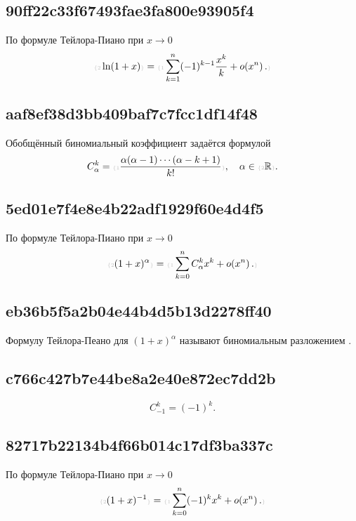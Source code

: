 \documentclass[11pt, a5paper]{article}
\newenvironment{note}[1]{\goodbreak\par\subsection{\hfill \color{lightgray}\tiny #1}}{}
\newenvironment{icloze}[2][\ldots]{%
  \ignorespaces\text{\tiny \color{lightgray}\{#2} %
}{%
  \text{\tiny\color{lightgray}\}}\unskip%
}
\begin{document}
\begin{note}{90ff22c33f67493fae3fa800e93905f4}
    По формуле Тейлора-Пиано при \( x \to 0 \)
    \[
        \begin{icloze}{2}\ln (1 + x)\end{icloze} = \begin{icloze}{1}\sum_{k=1}^{n} (-1)^{k - 1} \frac{x^{k} }{k } + o\!\left(x^{n}\right). \end{icloze}
    \]
\end{note}

\begin{note}{aaf8ef38d3bb409baf7c7fcc1df14f48}
    \begin{icloze}{3}Обобщённый биномиальный коэффициент\end{icloze} задаётся формулой
    \[
        C_\alpha^k = \begin{icloze}{1}\frac{\alpha(\alpha - 1) \cdots (\alpha - k + 1)}{k! }\end{icloze}, \quad \alpha \in \begin{icloze}{2}\mathbb R\end{icloze}.
    \]
\end{note}

\begin{note}{5ed01e7f4e8e4b22adf1929f60e4d4f5}
    По формуле Тейлора-Пиано при \( x \to 0 \)
    \[
        \begin{icloze}{2}(1 + x)^{\alpha} \end{icloze} = \begin{icloze}{1}\sum_{k=0}^{n} C_\alpha^k x^{k} + o\!\left(x^{n}\right). \end{icloze}
    \]
\end{note}

\begin{note}{eb36b5f5a2b04e44b4d5b13d2278ff40}
    Формулу Тейлора-Пеано для \( (1 + x)^{\alpha} \) называют \begin{icloze}{1}биномиальным разложением\end{icloze}.
\end{note}

\begin{note}{c766c427b7e44be8a2e40e872ec7dd2b}
    \[
        C_{-1}^{k} = (-1)^{k}.
    \]
\end{note}

\begin{note}{82717b22134b4f66b014c17df3ba337c}
    По формуле Тейлора-Пиано при \( x \to 0 \)
    \[
        \begin{icloze}{2}(1 + x)^{-1} \end{icloze} = \begin{icloze}{1}\sum_{k=0}^{n} (-1)^{k} x^{k} + o\!\left(x^{n}\right). \end{icloze}
    \]
\end{note}
\end{document}
